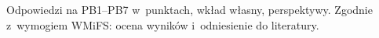 
\begin{planroboczy}[ok. 2 s.]
Odpowiedzi na PB1–PB7 w~punktach, wkład własny, perspektywy. Zgodnie z~wymogiem WMiFS: ocena wyników i~odniesienie do literatury.
\end{planroboczy}

